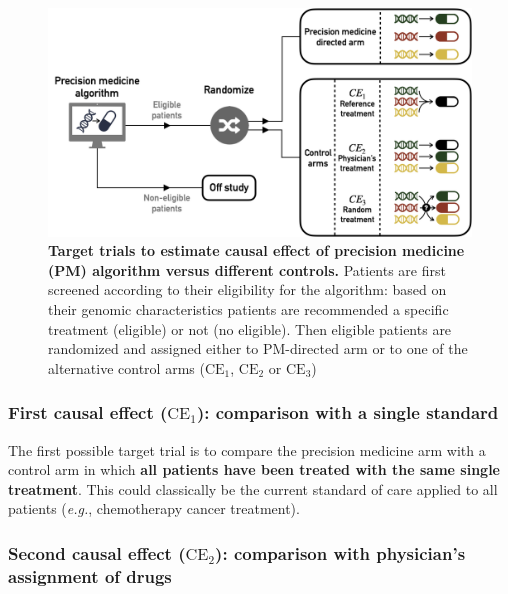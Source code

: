 \documentclass[a4paper,12pt,twoside,onecolumn,openright,final,oldfontcommands]{memoir}
\begin{document}
\begin{figure}

{\centering \includegraphics[width=0.9\linewidth]{fig/target-trials} 

}

\caption[Target trials to estimate causal effect of precision medicine (PM) algorithm versus different controls]{\textbf{Target trials to estimate causal
effect of precision medicine (PM) algorithm versus different controls.}
Patients are first screened according to their eligibility for the
algorithm: based on their genomic characteristics patients are
recommended a specific treatment (eligible) or not (no eligible). Then
eligible patients are randomized and assigned either to PM-directed arm
or to one of the alternative control arms (\(\text{CE}_1\),
\(\text{CE}_2\) or \(\text{CE}_3\))}\label{fig:target-trials}
\end{figure}










\subsubsection{\texorpdfstring{First causal effect (\(\text{CE}_1\)):
comparison with a single
standard}{First causal effect (\textbackslash{}text\{CE\}\_1): comparison with a single standard}}\label{first-causal-effect-textce_1-comparison-with-a-single-standard}

The first possible target trial is to compare the precision medicine arm
with a control arm in which \textbf{all patients have been treated with
the same single treatment}. This could classically be the current
standard of care applied to all patients (\emph{e.g.}, chemotherapy
cancer treatment).

\subsubsection{\texorpdfstring{Second causal effect (\(\text{CE}_2\)):
comparison with physician's assignment of
drugs}{Second causal effect (\textbackslash{}text\{CE\}\_2): comparison with physician's assignment of drugs}}\label{second-causal-effect-textce_2-comparison-with-physicians-assignment-of-drugs}
\end{document}
